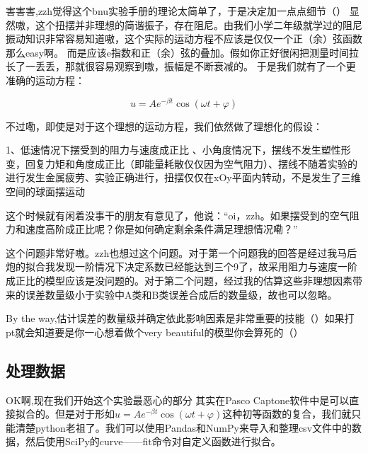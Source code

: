 \documentclass[UTF8]{ctexart}
\begin{document}
\noindent 害害害,zzh觉得这个bnu实验手册的理论太简单了，于是决定加一点点细节（）\newline
\noindent 显然嗷，这个扭摆并非理想的简谐振子，存在阻尼。由我们小学二年级就学过的阻尼振动知识非常容易知道嗷，这个实际的运动方程不应该是仅仅一个正（余）弦函数那么easy啊。
而是应该e指数和正（余）弦的叠加。假如你正好很闲把测量时间拉长了一丢丢，那就很容易观察到嗷，振幅是不断衰减的。\newline
\noindent 于是我们就有了一个更准确的运动方程：

\begin{equation}
  u = A e^{-\beta t} \cos(\omega t + \varphi)
\end{equation}

\noindent 不过嘞，即使是对于这个理想的运动方程，我们依然做了理想化的假设：\newline

\begin{centering}
  1、低速情况下摆受到的阻力与速度成正比 、小角度情况下，摆线不发生塑性形变，回复力矩和角度成正比（即能量耗散仅仅因为空气阻力）、摆线不随着实验的进行发生金属疲劳、实验正确进行，扭摆仅仅在xOy平面内转动，不是发生了三维空间的球面摆运动
\end{centering}

\noindent   \newline
\noindent 这个时候就有闲着没事干的朋友有意见了，他说：“oi，zzh。如果摆受到的空气阻力和速度高阶成正比呢？你是如何确定剩余条件满足理想情况嘞？”\newline

\noindent 这个问题非常好嗷。zzh也想过这个问题。对于第一个问题我的回答是经过我马后炮的拟合我发现一阶情况下决定系数已经能达到三个9了，故采用阻力与速度一阶成正比的模型应该是没问题的。对于第二个问题，经过我的估算这些非理想因素带来的误差数量级小于实验中A类和B类误差合成后的数量级，故也可以忽略。\newline

\noindent By the way,估计误差的数量级并确定依此影响因素是非常重要的技能（）如果打pt就会知道要是你一心想着做个very beautiful的模型你会算死的（） 

\subsection{处理数据}

\noindent OK啊,现在我们开始这个实验最恶心的部分 \newline
\noindent 其实在Pasco Captone软件中是可以直接拟合的。但是对于形如$ u = A e^{-\beta t} \cos(\omega t + \varphi)$这种初等函数的复合，我们就只能清楚python老祖了。我们可以使用Pandas和NumPy来导入和整理csv文件中的数据，然后使用SciPy的curve——fit命令对自定义函数进行拟合。
\end{document}
